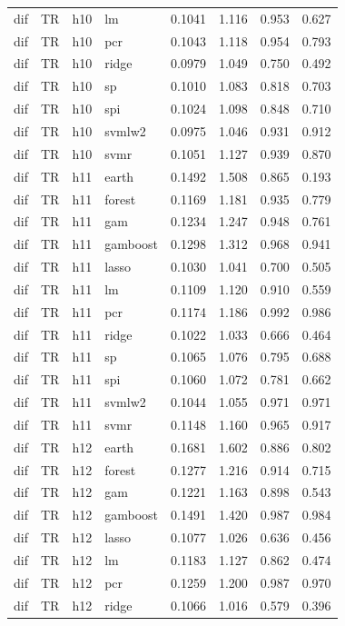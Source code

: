 \begin{ThreePartTable}
\begin{longtable}[t]{llclcccc}
dif & TR & h10 & lm & 0.1041 & 1.116 & 0.953 & 0.627\\
dif & TR & h10 & pcr & 0.1043 & 1.118 & 0.954 & 0.793\\
dif & TR & h10 & ridge & 0.0979 & 1.049 & 0.750 & 0.492\\
dif & TR & h10 & sp & 0.1010 & 1.083 & 0.818 & 0.703\\
dif & TR & h10 & spi & 0.1024 & 1.098 & 0.848 & 0.710\\
dif & TR & h10 & svmlw2 & 0.0975 & 1.046 & 0.931 & 0.912\\
dif & TR & h10 & svmr & 0.1051 & 1.127 & 0.939 & 0.870\\
\addlinespace
dif & TR & h11 & earth & 0.1492 & 1.508 & 0.865 & 0.193\\
dif & TR & h11 & forest & 0.1169 & 1.181 & 0.935 & 0.779\\
dif & TR & h11 & gam & 0.1234 & 1.247 & 0.948 & 0.761\\
dif & TR & h11 & gamboost & 0.1298 & 1.312 & 0.968 & 0.941\\
dif & TR & h11 & lasso & 0.1030 & 1.041 & 0.700 & 0.505\\
dif & TR & h11 & lm & 0.1109 & 1.120 & 0.910 & 0.559\\
dif & TR & h11 & pcr & 0.1174 & 1.186 & 0.992 & 0.986\\
dif & TR & h11 & ridge & 0.1022 & 1.033 & 0.666 & 0.464\\
dif & TR & h11 & sp & 0.1065 & 1.076 & 0.795 & 0.688\\
dif & TR & h11 & spi & 0.1060 & 1.072 & 0.781 & 0.662\\
dif & TR & h11 & svmlw2 & 0.1044 & 1.055 & 0.971 & 0.971\\
dif & TR & h11 & svmr & 0.1148 & 1.160 & 0.965 & 0.917\\
\addlinespace
dif & TR & h12 & earth & 0.1681 & 1.602 & 0.886 & 0.802\\
dif & TR & h12 & forest & 0.1277 & 1.216 & 0.914 & 0.715\\
dif & TR & h12 & gam & 0.1221 & 1.163 & 0.898 & 0.543\\
dif & TR & h12 & gamboost & 0.1491 & 1.420 & 0.987 & 0.984\\
dif & TR & h12 & lasso & 0.1077 & 1.026 & 0.636 & 0.456\\
dif & TR & h12 & lm & 0.1183 & 1.127 & 0.862 & 0.474\\
dif & TR & h12 & pcr & 0.1259 & 1.200 & 0.987 & 0.970\\
dif & TR & h12 & ridge & 0.1066 & 1.016 & 0.579 & 0.396\\

\end{longtable}
\end{ThreePartTable}
